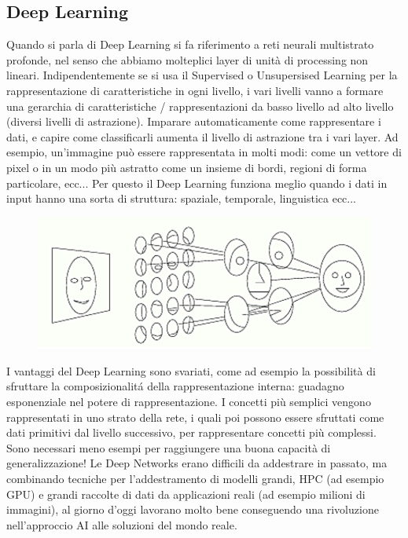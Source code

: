 \documentclass{article}
\begin{document}
\subsection{Deep Learning}
Quando si parla di Deep Learning si fa riferimento a reti neurali multistrato profonde, nel senso che abbiamo molteplici layer di unità di processing non lineari. Indipendentemente se si usa il Supervised o Unsupersised Learning per la rappresentazione di caratteristiche in ogni livello, i vari livelli vanno a formare una gerarchia di caratteristiche / rappresentazioni da basso livello ad alto livello (diversi livelli di astrazione).
Imparare automaticamente come rappresentare i dati, e capire come classificarli aumenta il livello di astrazione tra i vari layer. Ad esempio, un'immagine può essere rappresentata in molti modi: come un vettore di pixel o in un modo più astratto come un insieme di bordi, regioni di forma particolare, ecc... Per questo il Deep Learning funziona meglio quando i dati in input hanno una sorta di struttura: spaziale, temporale, linguistica ecc...
\begin{figure}[H]
\centering
\includegraphics[scale=0.4]{Images/deeplearningimage.png}
\end{figure}
I vantaggi del Deep Learning sono svariati, come ad esempio la possibilità di sfruttare la composizionalitá della rappresentazione interna: guadagno esponenziale nel potere di rappresentazione. I concetti più semplici vengono rappresentati in uno strato della rete, i quali poi possono essere sfruttati come dati primitivi dal livello successivo, per rappresentare concetti più complessi. Sono necessari meno esempi per raggiungere una buona capacità di generalizzazione! Le Deep Networks erano difficili da addestrare in passato, ma combinando tecniche per l'addestramento di modelli grandi, HPC (ad esempio GPU) e grandi raccolte di dati da applicazioni reali (ad esempio milioni di immagini), al giorno d'oggi lavorano molto bene conseguendo una rivoluzione nell'approccio AI alle soluzioni del mondo reale.







%
%
\end{document}
